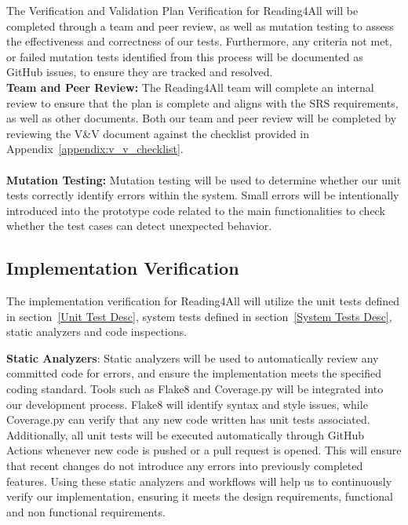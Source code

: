 \documentclass[12pt, titlepage]{article}
\begin{document}
The Verification and Validation Plan Verification for Reading4All will be completed through a team and peer review, as well as mutation testing to assess the effectiveness and correctness of our tests. 
Furthermore, any criteria not met, or failed mutation tests identified from this process will be documented as GitHub issues, to ensure they are tracked and resolved. 
\\

\textbf{Team and Peer Review:}
The Reading4All team will complete an internal review to ensure that the plan is complete and aligns with the SRS requirements, as well as other documents. 
Both our team and peer review will be completed by reviewing the V\&V document against the checklist provided in Appendix~\ref{appendix:v_v_checklist}.   \\ \\

\textbf{Mutation Testing:}
Mutation testing will be used to determine whether our unit tests correctly identify errors within the system.
Small errors will be intentionally introduced into the prototype code related to the main functionalities to check whether the test cases can detect unexpected behavior. 


\subsection{Implementation Verification}




The implementation verification for Reading4All will utilize the unit tests defined in section~\ref{Unit Test Desc}, system tests defined in section~\ref{System Tests Desc},
static analyzers and code inspections.

\textbf{Static Analyzers}:
Static analyzers will be used to automatically review any committed code for errors, and ensure the implementation meets the specified coding standard.
Tools such as Flake8 and Coverage.py will be integrated into our development process. Flake8 will identify syntax and style issues, while Coverage.py can verify that any new code written has unit tests associated. 
Additionally, all unit tests will be executed automatically through GitHub Actions whenever new code is pushed or a pull request is opened. This will ensure that recent changes do not introduce any errors into previously completed features. 
Using these static analyzers and workflows will help us to continuously verify our implementation, ensuring it meets the design requirements, functional and non functional requirements.
\end{document}
